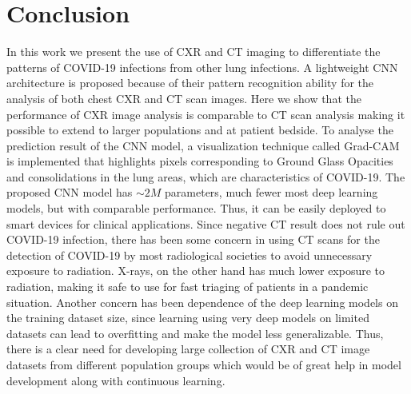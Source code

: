 \documentclass[10pt,journal,compsoc]{IEEEtran}
\begin{document}
%






\section{Conclusion}
In this work we present the use of CXR and CT imaging to differentiate the patterns of COVID-19 infections from other lung infections. A lightweight CNN architecture is proposed because of their pattern recognition ability for the analysis of both chest CXR and CT scan images. Here we show that the performance of CXR image analysis is comparable to CT scan analysis making it possible to extend to larger populations and at patient bedside. To analyse the prediction result of the CNN model, a visualization technique called Grad-CAM is implemented that highlights pixels corresponding to Ground Glass Opacities and consolidations in the lung areas, which are characteristics of COVID-19. The proposed CNN model has \(\sim2M\)  parameters, much fewer most deep learning models, but with comparable performance. Thus, it can be easily deployed to smart devices for clinical applications. Since negative CT result does not rule out COVID-19 infection, there has been some concern in using CT scans for the detection of COVID-19 by most radiological societies to avoid unnecessary exposure to radiation. X-rays, on the other hand has much lower exposure to radiation, making it safe to use for fast triaging of patients in a pandemic situation. Another concern has been dependence of the deep learning models on the training dataset size, since learning using very deep models on limited datasets can lead to overfitting and make the model less generalizable. Thus, there is a clear need for developing large collection of CXR and CT image datasets from different population groups which would be of great help in model development along with continuous learning.
\end{document}

